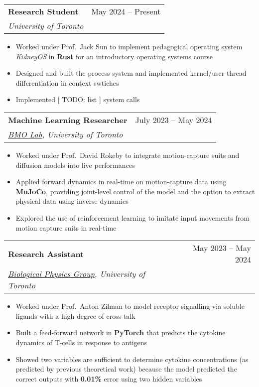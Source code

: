 \documentclass[letterpaper,11pt]{article}
\makeatletter
\newcommand{\resumeItem}[1]{
  \item\small{
    {#1 \vspace{-2pt}}
  }
}
\newcommand{\resumeSubheading}[4]{
  \vspace{-2pt}\item
    \begin{tabular*}{0.97\textwidth}[t]{l@{\extracolsep{\fill}}r}
      \textbf{#1} & #2 \\
      \textit{\small#3} & \textit{\small #4} \\
    \end{tabular*}\vspace{-7pt}
}
\newcommand{\resumeItemListStart}{\begin{itemize}}
\newcommand{\resumeItemListEnd}{\end{itemize}\vspace{-5pt}}
\makeatother
\begin{document}
      \resumeSubheading
      {\small{Research Student} \href{https://github.com/KidneyOS/KidneyOS}{\footnotesize\faIcon{external-link-alt}}}{\small{May 2024 -- Present}}
      {University of Toronto}{}
        \resumeItemListStart
        \resumeItem{Worked under Prof.\ Jack Sun to implement pedagogical operating system \textit{KidneyOS} in \textbf{Rust} for an introductory operating systems course}
        \resumeItem{Designed and built the process system and implemented kernel/user thread differentiation in context swtiches}
        \resumeItem{Implemented [ TODO: list ] system calls}
        \resumeItemListEnd

    \resumeSubheading
    {\small{Machine Learning Researcher} \href{https://github.com/ff-zhang/mocap-mujoco}{\footnotesize\faIcon{external-link-alt}}}{\small{July 2023 -- May 2024}}
    {\href{https://bmolab.artsci.utoronto.ca/}{BMO Lab}, University of Toronto}{}
      \resumeItemListStart
      \resumeItem{Worked under Prof.\ David Rokeby to integrate motion-capture suits and diffusion models into live performances}
      \resumeItem{Applied forward dynamics in real-time on motion-capture data using \textbf{MuJoCo}, providing joint-level control of the model and the option to extract physical data using inverse dynamics}
      \resumeItem{Explored the use of reinforcement learning to imitate input movements from motion capture suits in real-time}
      \resumeItemListEnd

      \resumeSubheading
      {\small{Research Assistant} \href{https://github.com/ff-zhang/t-cell-response-encoder/tree/master}{\footnotesize\faIcon{external-link-alt}}}{\small{May 2023 -- May 2024}}
      {\href{https://www.physics.utoronto.ca/~zilmana/}{Biological Physics Group}, University of Toronto}{}%
        \resumeItemListStart
        \resumeItem{Worked under Prof.\ Anton Zilman to model receptor signalling via soluble ligands with a high degree of cross-talk}
        \resumeItem{Built a feed-forward network in \textbf{PyTorch} that predicts the cytokine dynamics of T-cells in response to antigens}
        \resumeItem{Showed two variables are sufficient to determine cytokine concentrations (as predicted by previous theoretical work) because the model predicted the correct outputs with \textbf{0.01\%} error using two hidden variables}
        \resumeItemListEnd
        
\end{document}
